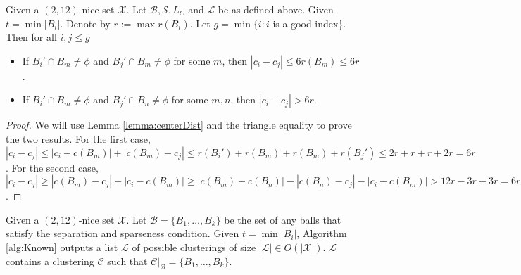 \documentclass[11pt]{article}
\newcommand{\mc}{\mathcal}
\begin{document}
\begin{corollary}
Given a $(2,12)$-nice set $\mc X$. Let $\mc B, \mc S, L_C$ and $\mc L$ be as defined above. Given $t = \min |B_i|$. Denote by $r := \max r(B_i)$. Let $g = \min \{i: i$ is a good index\}. Then for all $i,j \le g$
\begin{itemize}
\item If $B_i' \cap B_m \neq \phi$ and $B_j' \cap B_m\neq\phi$ for some $m$, then $|c_i-c_j| \le 6 r(B_m) \le 6r$.
\item If $B_i' \cap B_m \neq \phi$ and $B_j' \cap B_n\neq\phi$ for some $m,n$, then $|c_i-c_j| > 6r$.
\end{itemize}
\label{cor:centerDist}
\end{corollary}

\begin{proof}
We will use Lemma \ref{lemma:centerDist} and the  triangle equality to prove the two results. For the first case, $|c_i-c_j| \le |c_i-c(B_m)| + |c(B_m)-c_j| \le r(B_i') + r(B_m) + r(B_m) + r(B_j') \le 2r + r + r + 2r = 6r$. For the second case, $|c_i-c_j| \ge  |c(B_m)-c_j| - |c_i-c(B_m)| \ge |c(B_m)-c(B_n)| - |c(B_n) - c_j| - |c_i-c(B_m)| > 12r - 3r -3r = 6r$.
\end{proof}

\begin{theorem}
Given a $(2,12)$-nice set $\mc X$. Let $\mc B = \{B_1,\ldots,B_k\}$ be the set of any balls that satisfy the separation and sparseness condition. Given $t = \min |B_i|$, Algorithm \ref{alg:Known} outputs a list $\mc L$ of possible clusterings of size $|\mc L| \in O(|\mc X|)$. $\mc L$ contains a clustering $\mc C$ such that $\mc C|_{\mc B} = \{B_1,\ldots,B_k\}$.
\end{theorem}
\end{document}
